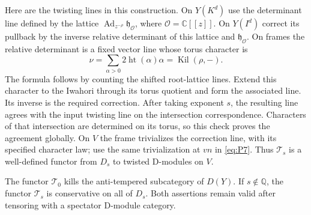 Here are the twisting lines in this construction.  On $Y(K^d)$ use the
determinant line defined by the lattice
$\operatorname{Ad}_{z^{-\rho}}\mathfrak h_{\mathcal O}$, where
$\mathcal O=\mathbb C[[z]]$.  On $Y(I^d)$ correct its pullback by the
inverse relative determinant of this lattice and
$\mathfrak h_{\mathcal O}$.  On frames the relative determinant is a fixed
vector line whose torus character is
\begin{equation}
 \nu=\sum_{\alpha>0}2\operatorname{ht}(\alpha)\alpha
       =\operatorname{Kil}(\rho,-).
 \label{planch:det-character}
\end{equation}
The formula follows by counting the shifted root-lattice lines.  Extend
this character to the Iwahori through its torus quotient and form the
associated line.  Its inverse is the required correction.  After taking
exponent $s$, the resulting line agrees with the input twisting line on
the intersection correspondence.  Characters of that intersection are
determined on its torus, so this check proves the agreement globally.
On $V$ the frame trivializes the correction line, with its specified
character law; use the same trivialization at $vn$ in \eqref{eq:P7}.
Thus $\mathcal T_s$ is a well-defined functor from $D_s$ to twisted
D-modules on $V$.

\begin{proposition}
\label{planch:finite-test}
The functor $\mathcal T_0$ kills the anti-tempered subcategory of $D(Y)$.
If $s\notin\mathbb Q$, the functor $\mathcal T_s$ is conservative on all
of $D_s$.  Both assertions remain valid after tensoring with a spectator
D-module category.
\end{proposition}

